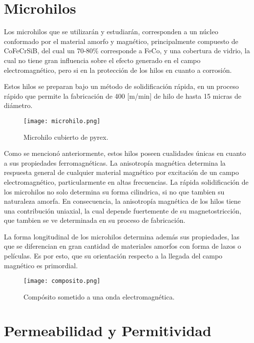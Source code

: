 \documentclass[12pt,letterpaper]{report}
\numberwithin{equation}{section}
\begin{document}
\section{Microhilos}

Los microhilos que se utilizarán y estudiarán, corresponden a un núcleo conformado por el material amorfo y magnético, principalmente compuesto de CoFeCrSiB, del cual un 70-80\% corresponde a FeCo, y una cobertura de vidrio, la cual no tiene gran influencia sobre el efecto generado en el campo electromagnético, pero si en la protección de los hilos en cuanto a corrosión.

Estos hilos se preparan bajo un método de solidificación rápida, en un proceso rápido que permite la fabricación de 400 [m/min] de hilo de hasta 15 micras de diámetro.

\begin{figure}[H]
	\centering\texttt{[image: microhilo.png]}
	\caption{Microhilo cubierto de pyrex.  \cite{Wire_theory_3}}
\end{figure}


Como se mencionó anteriormente, estos hilos poseen cualidades únicas en cuanto a sus propiedades ferromagnéticas. La anisotropía magnética determina la respuesta general de cualquier material magnético por excitación de un campo electromagnético, particularmente en altas frecuencias. La rápida solidificación de los microhilos no solo determina su forma cilindrica, si no que tambien su naturaleza amorfa. En consecuencia, la anisotropía magnética de los hilos tiene una contribución uniaxial, la cual depende fuertemente de su magnetostricción, que tambien se ve determinada en su proceso de fabricación.

La forma longitudinal de los microhilos determina además sus propiedades, las que se diferencian en gran cantidad de materiales amorfos con forma de lazos o películas. Es por esto, que su orientación respecto a la llegada del campo magnético es primordial.

\begin{figure}[H]
	\centering\texttt{[image: composito.png]}
	\caption{Compósito sometido a una onda electromagnética. \cite{Wire_theory_1}}
	\label{fig: composito}
\end{figure} 

\section{Permeabilidad y Permitividad}
\end{document}
